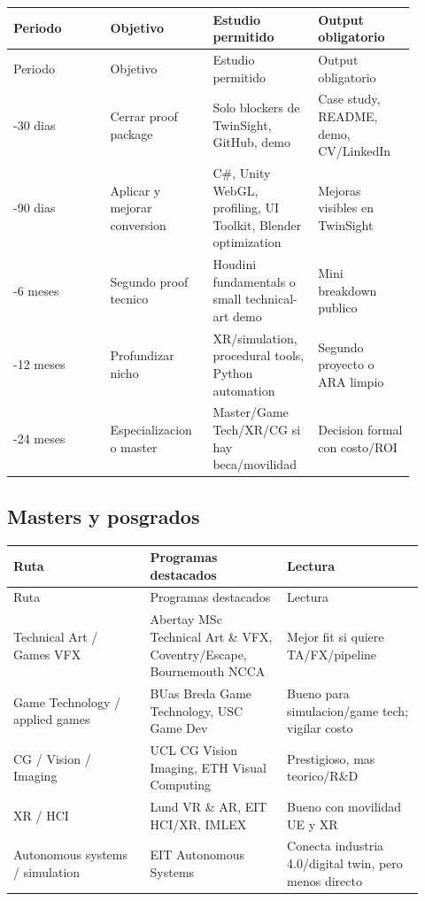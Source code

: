 \begin{center}
\scriptsize
\begin{longtable}{>{\raggedright\arraybackslash}p{0.225\linewidth} >{\raggedright\arraybackslash}p{0.225\linewidth} >{\raggedright\arraybackslash}p{0.225\linewidth} >{\raggedright\arraybackslash}p{0.225\linewidth}}
\toprule
Periodo & Objetivo & Estudio permitido & Output obligatorio \\
\midrule
\endfirsthead
\toprule
Periodo & Objetivo & Estudio permitido & Output obligatorio \\
\midrule
\endhead
0-30 dias & Cerrar proof package & Solo blockers de TwinSight, GitHub, demo & Case study, README, demo, CV/LinkedIn \\
31-90 dias & Aplicar y mejorar conversion & C\#, Unity WebGL, profiling, UI Toolkit, Blender optimization & Mejoras visibles en TwinSight \\
3-6 meses & Segundo proof tecnico & Houdini fundamentals o small technical-art demo & Mini breakdown publico \\
6-12 meses & Profundizar nicho & XR/simulation, procedural tools, Python automation & Segundo proyecto o ARA limpio \\
12-24 meses & Especializacion o master & Master/Game Tech/XR/CG si hay beca/movilidad & Decision formal con costo/ROI \\
\bottomrule
\end{longtable}
\end{center}


\subsection{Masters y posgrados}


\begin{center}
\scriptsize
\begin{longtable}{>{\raggedright\arraybackslash}p{0.305\linewidth} >{\raggedright\arraybackslash}p{0.305\linewidth} >{\raggedright\arraybackslash}p{0.305\linewidth}}
\toprule
Ruta & Programas destacados & Lectura \\
\midrule
\endfirsthead
\toprule
Ruta & Programas destacados & Lectura \\
\midrule
\endhead
Technical Art / Games VFX & Abertay MSc Technical Art \& VFX, Coventry/Escape, Bournemouth NCCA & Mejor fit si quiere TA/FX/pipeline \\
Game Technology / applied games & BUas Breda Game Technology, USC Game Dev & Bueno para simulacion/game tech; vigilar costo \\
CG / Vision / Imaging & UCL CG Vision Imaging, ETH Visual Computing & Prestigioso, mas teorico/R\&D \\
XR / HCI & Lund VR \& AR, EIT HCI/XR, IMLEX & Bueno con movilidad UE y XR \\
Autonomous systems / simulation & EIT Autonomous Systems & Conecta industria 4.0/digital twin, pero menos directo \\
\bottomrule
\end{longtable}
\end{center}



